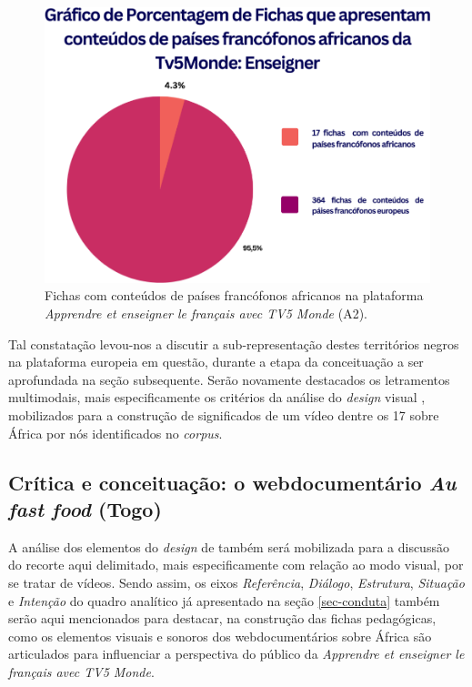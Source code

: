 \documentclass[portuguese]{textolivre}
\begin{document}
\begin{figure}[h]
    \centering
    \begin{minipage}{.55\textwidth}
    \includegraphics[width=\linewidth]{Fig5.png}
    \caption{Fichas com conteúdos de países francófonos africanos na plataforma \textit{Apprendre et enseigner le français avec TV5 Monde} (A2).}
    \label{fig5}
    \end{minipage}
\end{figure}

Tal constatação levou-nos a discutir a sub-representação destes territórios negros na plataforma europeia em questão, durante a etapa da conceituação a ser aprofundada na seção subsequente. Serão novamente destacados os letramentos multimodais, mais especificamente os critérios da análise do \textit{design} visual \cite{kalantzis_letramentos_2020}, mobilizados para a construção de significados de um vídeo dentre os 17 sobre África por nós identificados no \textit{corpus}. 

\subsection{Crítica e conceituação: o webdocumentário \textit{Au fast food} (Togo)}\label{sec-organizacao}
A análise dos elementos do \textit{design} de \textcite{kalantzis_letramentos_2020} também será mobilizada para a discussão do recorte aqui delimitado, mais especificamente com relação ao modo visual, por se tratar de vídeos. Sendo assim, os eixos \emph{Referência}, \emph{Diálogo}, \emph{Estrutura}, \emph{Situação} e \emph{Intenção} do quadro analítico já apresentado na seção \ref{sec-conduta} também serão aqui mencionados para destacar, na construção das fichas pedagógicas, como os elementos visuais e sonoros dos webdocumentários sobre África são articulados para influenciar a perspectiva do público da \textit{Apprendre et enseigner le français avec TV5 Monde}.
\end{document}
